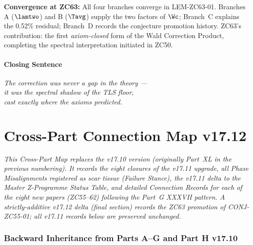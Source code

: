 \documentclass[12pt, a4paper]{article}
\begin{document}
\begin{genealogybox}[title={How ZC63's Key Objects Trace Back}]
\textbf{Convergence at ZC63:}
All four branches converge in LEM-ZC63-01.
Branches A ($\lamtwo$) and B ($\Tavg$) supply the two
factors of $\Wc$; Branch~C explains the 0.52\% residual;
Branch~D records the conjecture promotion history.
ZC63's contribution: the first \emph{axiom-closed} form
of the Wald Correction Product, completing the
spectral interpretation initiated in ZC50.
\end{genealogybox}

\subsection{Closing Sentence}

\bigskip
\begin{center}
\textit{The correction was never a gap in the theory ---\\
it was the spectral shadow of the TLS floor,\\
cast exactly where the axioms predicted.}
\end{center}



\part{Cross-Part Connection Map v17.12}
\label{part:xlii-conmap}

\noindent
\textit{This Cross-Part Map replaces the v17.10 version (originally
Part~XL in the previous numbering). It records the eight closures
of the v17.11 upgrade, all Phase Misalignments registered as scar
tissue (Failure Stance), the v17.11 delta to the Master Z-Programme
Status Table, and detailed Connection Records for each of the eight
new papers (ZC55--62) following the Part~G XXXVII pattern. A strictly-additive v17.12 delta (final section) records the ZC63 promotion of CONJ-ZC55-01; all v17.11 records below are preserved unchanged.}

\bigskip

\section{Backward Inheritance from Parts A--G and Part H v17.10}
\label{sec:xlii-backward}
\end{document}
